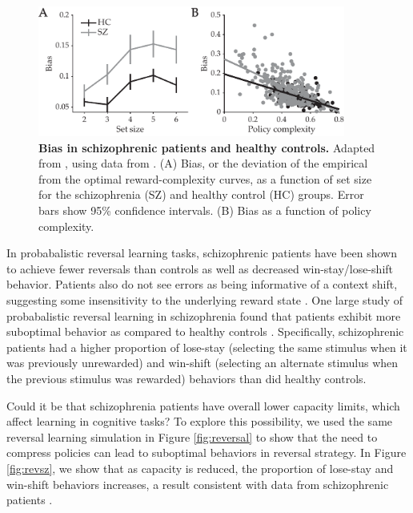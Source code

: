 \documentclass[11pt]{article}
\begin{document}
\begin{figure}
    \centering
    \includegraphics[width=0.9\textwidth]{figs/collins14bias.pdf}
            \caption{\textbf{Bias in schizophrenic patients and healthy controls.} Adapted from \cite{gershmanlai20}, using data from \citet{collins14}. (A) Bias, or the deviation of the empirical from the optimal reward-complexity curves, as a function of set size for the schizophrenia (SZ) and healthy control (HC) groups. Error bars show 95\% confidence intervals. (B) Bias as a function of policy complexity.}
    \label{fig:collins14bias}
\end{figure}

In probabalistic reversal learning tasks, schizophrenic patients have been shown to achieve fewer reversals than controls as well as decreased win-stay/lose-shift behavior. Patients also do not see errors as being informative of a context shift, suggesting some insensitivity to the underlying reward state \citep{Culbreth2016-rs,Schlagenhauf2014-oz}. One large study of probabalistic reversal learning in schizophrenia found that patients exhibit more suboptimal behavior as compared to healthy controls \citep{Reddy2016-ew}. Specifically, schizophrenic patients had a higher proportion of lose-stay (selecting the same stimulus when it was previously unrewarded) and win-shift (selecting an alternate stimulus when the previous stimulus was rewarded) behaviors than did healthy controls. 

Could it be that schizophrenia patients have overall lower capacity limits, which affect learning in cognitive tasks? To explore this possibility, we used the same reversal learning simulation in Figure \ref{fig:reversal} to show that the need to compress policies can lead to suboptimal behaviors in reversal strategy. In Figure \ref{fig:revsz}, we show that as capacity is reduced, the proportion of lose-stay and win-shift behaviors increases, a result consistent with data from schizophrenic patients \citep{Reddy2016-ew}.
\end{document}
